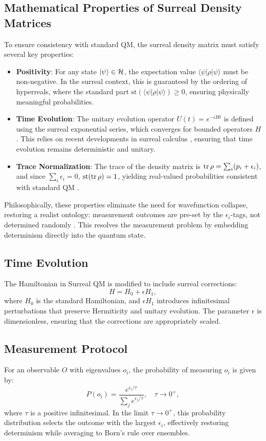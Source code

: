 \documentclass{article}
\begin{document}
\subsection{Mathematical Properties of Surreal Density Matrices}
To ensure consistency with standard QM, the surreal density matrix must satisfy several key properties:
\begin{itemize}
    \item \textbf{Positivity}: For any state \(\ket{\psi} \in \mathcal{H}\), the expectation value \(\langle \psi | \rho | \psi \rangle\) must be non-negative. In the surreal context, this is guaranteed by the ordering of hyperreals, where the standard part \(\text{st}(\langle \psi | \rho | \psi \rangle) \geq 0\), ensuring physically meaningful probabilities.
    \item \textbf{Time Evolution}: The unitary evolution operator \(U(t) = e^{-i H t}\) is defined using the surreal exponential series, which converges for bounded operators \(H\). This relies on recent developments in surreal calculus \cite{Ehrlich2012}, ensuring that time evolution remains deterministic and unitary.
    \item \textbf{Trace Normalization}: The trace of the density matrix is \(\tr \rho = \sum_i (p_i + \epsilon_i)\), and since \(\sum_i \epsilon_i = 0\), \(\text{st}(\tr \rho) = 1\), yielding real-valued probabilities consistent with standard QM \cite{Goldblatt1998}.
\end{itemize}
Philosophically, these properties eliminate the need for wavefunction collapse, restoring a realist ontology: measurement outcomes are pre-set by the \(\epsilon_i\)-tags, not determined randomly \cite{tHooft2014}. This resolves the measurement problem by embedding determinism directly into the quantum state.

\subsection{Time Evolution}
The Hamiltonian in Surreal QM is modified to include surreal corrections:
\begin{equation}
H = H_0 + \epsilon H_1,
\end{equation}
where \(H_0\) is the standard Hamiltonian, and \(\epsilon H_1\) introduces infinitesimal perturbations that preserve Hermiticity and unitary evolution. The parameter \(\epsilon\) is dimensionless, ensuring that the corrections are appropriately scaled.

\subsection{Measurement Protocol}
For an observable \(O\) with eigenvalues \(o_i\), the probability of measuring \(o_i\) is given by:
\begin{equation}
P(o_i) = \frac{e^{\epsilon_i / \tau}}{\sum_j e^{\epsilon_j / \tau}}, \quad \tau \to 0^+,
\end{equation}
where \(\tau\) is a positive infinitesimal. In the limit \(\tau \to 0^+\), this probability distribution selects the outcome with the largest \(\epsilon_i\), effectively restoring determinism while averaging to Born's rule over ensembles.
\end{document}
